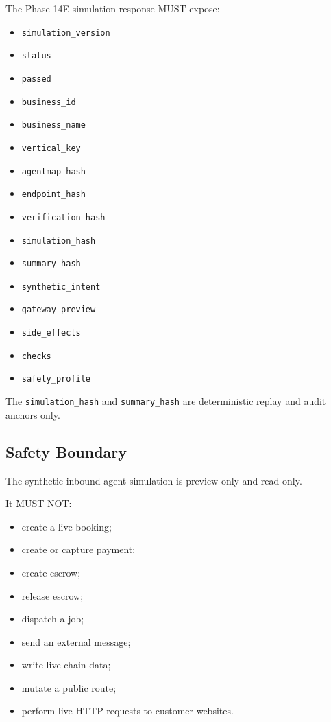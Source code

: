 The Phase 14E simulation response MUST expose:

\begin{itemize}
  \item \texttt{simulation\_version}
  \item \texttt{status}
  \item \texttt{passed}
  \item \texttt{business\_id}
  \item \texttt{business\_name}
  \item \texttt{vertical\_key}
  \item \texttt{agentmap\_hash}
  \item \texttt{endpoint\_hash}
  \item \texttt{verification\_hash}
  \item \texttt{simulation\_hash}
  \item \texttt{summary\_hash}
  \item \texttt{synthetic\_intent}
  \item \texttt{gateway\_preview}
  \item \texttt{side\_effects}
  \item \texttt{checks}
  \item \texttt{safety\_profile}
\end{itemize}

The \texttt{simulation\_hash} and \texttt{summary\_hash} are deterministic replay and audit anchors only.

\subsection{Safety Boundary}

The synthetic inbound agent simulation is preview-only and read-only.

It MUST NOT:

\begin{itemize}
  \item create a live booking;
  \item create or capture payment;
  \item create escrow;
  \item release escrow;
  \item dispatch a job;
  \item send an external message;
  \item write live chain data;
  \item mutate a public route;
  \item perform live HTTP requests to customer websites.
\end{itemize}

